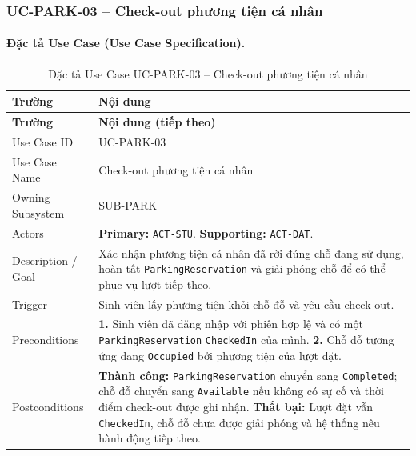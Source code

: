 \clearpage
\subsubsection{UC-PARK-03 -- Check-out phương tiện cá nhân}


\paragraph{Đặc tả Use Case (Use Case Specification).}
\small
\begin{longtable}{|L{42mm}|L{102mm}|}
  \caption{Đặc tả Use Case UC-PARK-03 -- Check-out phương tiện cá nhân}\label{tab:spec-UC-PARK-03}\\
  \hline
  \centering\arraybackslash\textbf{Trường} & \centering\arraybackslash\textbf{Nội dung}\\
  \hline
  \endfirsthead
  \hline
  \centering\arraybackslash\textbf{Trường} & \centering\arraybackslash\textbf{Nội dung (tiếp theo)}\\
  \hline
  \endhead
  Use Case ID & UC-PARK-03\\\hline
  Use Case Name & Check-out phương tiện cá nhân\\\hline
  Owning Subsystem & SUB-PARK\\\hline
  Actors & \textbf{Primary:} \texttt{ACT-STU}. \textbf{Supporting:} \texttt{ACT-DAT}.\\\hline
  Description / Goal & Xác nhận phương tiện cá nhân đã rời đúng chỗ đang sử dụng, hoàn tất \texttt{ParkingReservation} và giải phóng chỗ để có thể phục vụ lượt tiếp theo.\\\hline
  Trigger & Sinh viên lấy phương tiện khỏi chỗ đỗ và yêu cầu check-out.\\\hline
  Preconditions &
    \textbf{1.} Sinh viên đã đăng nhập với phiên hợp lệ và có một \texttt{ParkingReservation} \texttt{CheckedIn} của mình.\newline
    \textbf{2.} Chỗ đỗ tương ứng đang \texttt{Occupied} bởi phương tiện của lượt đặt.\\\hline
  Postconditions &
    \textbf{Thành công:} \texttt{ParkingReservation} chuyển sang \texttt{Completed}; chỗ đỗ chuyển sang \texttt{Available} nếu không có sự cố và thời điểm check-out được ghi nhận.\newline
    \textbf{Thất bại:} Lượt đặt vẫn \texttt{CheckedIn}, chỗ đỗ chưa được giải phóng và hệ thống nêu hành động tiếp theo.\\\hline

\end{longtable}
